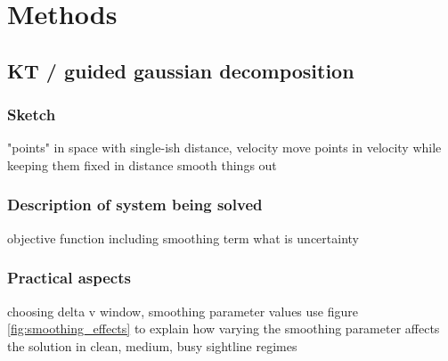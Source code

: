 \section{Methods}

\subsection{KT / guided gaussian decomposition}

\subsubsection{Sketch}
"points" in space with single-ish distance, velocity
move points in velocity while keeping them fixed in distance
smooth things out

\subsubsection{Description of system being solved}
objective function including smoothing term
what is uncertainty

\subsubsection{Practical aspects}
choosing delta v window, smoothing parameter values
use figure \ref{fig:smoothing_effects} to explain how varying the smoothing parameter affects the solution in clean, medium, busy sightline regimes